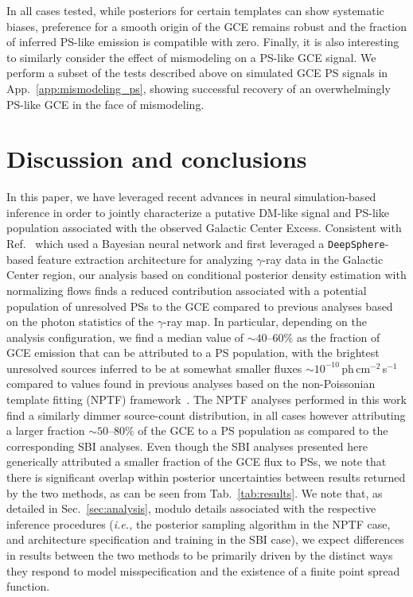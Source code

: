 \documentclass[prd,aps,10pt,nofootinbib,twocolumn,superscriptaddress,preprintnumbers,balancelastpage,longbibliography,floatfix]{revtex4-2}
\begin{document}
\bigskip

In all cases tested, while posteriors for certain templates can show systematic biases, preference for a smooth origin of the GCE remains robust and the fraction of inferred PS-like emission is compatible with zero. Finally, it is also interesting to similarly consider the effect of mismodeling on a PS-like GCE signal. We perform a subset of the tests described above on simulated GCE PS signals in App.~\ref{app:mismodeling_ps}, showing successful recovery of an overwhelmingly PS-like GCE in the face of mismodeling.

\section{Discussion and conclusions}
\label{sec:conclusion}

In this paper, we have leveraged recent advances in neural simulation-based inference in order to jointly characterize a putative DM-like signal and PS-like population associated with the observed \Fermi Galactic Center Excess. Consistent with Ref.~\cite{List:2020mzd} which used a Bayesian neural network and first leveraged a \texttt{DeepSphere}-based feature extraction architecture for analyzing $\gamma$-ray data in the Galactic Center region, our analysis based on conditional posterior density estimation with normalizing flows finds a reduced contribution associated with a potential population of unresolved PSs to the GCE compared to previous analyses based on the photon statistics of the $\gamma$-ray map. In particular, depending on the analysis configuration, we find a median value of $\sim40$--$60\%$ as the fraction of GCE emission that can be attributed to a PS population, with the brightest unresolved sources inferred to be at somewhat smaller fluxes $\sim 10^{-10}$\,ph\,cm$^{-2}$\,s$^{-1}$ compared to values found in previous analyses based on the non-Poissonian template fitting (NPTF) framework~\cite{Lee:2015fea}. The NPTF analyses performed in this work find a similarly dimmer source-count distribution, in all cases however attributing a larger fraction $\sim50$--$80\%$ of the GCE to a PS population as compared to the corresponding SBI analyses. Even though the SBI analyses presented here generically attributed a smaller fraction of the GCE flux to PSs, we note that there is significant overlap within posterior uncertainties between results returned by the two methods, as can be seen from Tab.~\ref{tab:results}. We note that, as detailed in Sec.~\ref{sec:analysis}, modulo details associated with the respective inference procedures (\emph{i.e.,} the posterior sampling algorithm in the NPTF case, and architecture specification and training in the SBI case), we expect differences in results between the two methods to be primarily driven by the distinct ways they respond to model misspecification and the existence of a finite point spread function.
\end{document}
